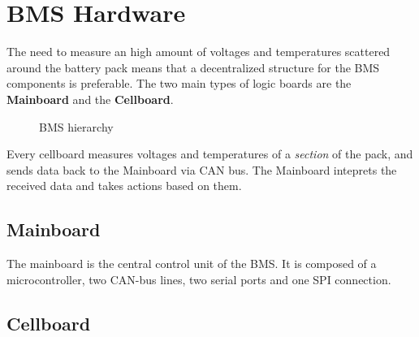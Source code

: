 \chapter{BMS Hardware}
The need to measure an high amount of voltages and temperatures scattered around the battery pack means that a decentralized structure for the BMS components is preferable. The two main types of logic boards are the \textbf{Mainboard} and the \textbf{Cellboard}.
\begin{figure}[h]
    \centering
    
    \caption{BMS hierarchy}
    \label{fig:bms_hierarchy}
\end{figure}
Every cellboard measures voltages and temperatures of a \textsl{section} of the pack, and sends data back to the Mainboard via CAN bus. The Mainboard inteprets the received data and takes actions based on them.

\section{Mainboard}
The mainboard is the central control unit of the BMS. It is composed of a microcontroller, two CAN-bus lines, two serial ports and one SPI connection.


\section{Cellboard}
